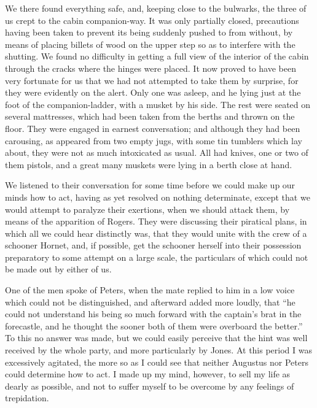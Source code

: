 We there found everything safe, and, keeping close to the bulwarks, the three
of us crept to the cabin companion-way. It was only partially closed,
precautions having been taken to prevent its being suddenly pushed to from
without, by means of placing billets of wood on the upper step so as to
interfere with the shutting. We found no difficulty in getting a full view of
the interior of the cabin through the cracks where the hinges were placed. It
now proved to have been very fortunate for us that we had not attempted to take
them by surprise, for they were evidently on the alert. Only one was asleep, and
he lying just at the foot of the companion-ladder, with a musket by his side.
The rest were seated on several mattresses, which had been taken from the berths
and thrown on the floor. They were engaged in earnest conversation; and although
they had been carousing, as appeared from two empty jugs, with some tin tumblers
which lay about, they were not as much intoxicated as usual. All had knives, one
or two of them pistols, and a great many muskets were lying in a berth close at
hand. 

We listened to their conversation for some time before we could make up our
minds how to act, having as yet resolved on nothing determinate, except that we
would attempt to paralyze their exertions, when we should attack them, by means
of the apparition of Rogers. They were discussing their piratical plans, in
which all we could hear distinctly was, that they would unite with the crew of a
schooner Hornet, and, if possible, get the schooner herself into their
possession preparatory to some attempt on a large scale, the particulars of
which could not be made out by either of us. 

One of the men spoke of Peters, when the mate replied to him in a low voice
which could not be distinguished, and afterward added more loudly, that ``he
could not understand his being so much forward with the captain's brat in the
forecastle, and he thought the sooner both of them were overboard the better.''
To this no answer was made, but we could easily perceive that the hint was well
received by the whole party, and more particularly by Jones. At this period I
was excessively agitated, the more so as I could see that neither Augustus nor
Peters could determine how to act. I made up my mind, however, to sell my life
as dearly as possible, and not to suffer myself to be overcome by any feelings
of trepidation. 

